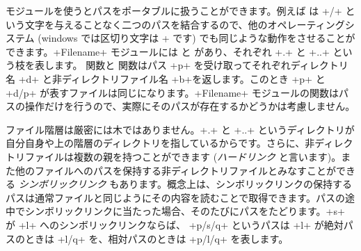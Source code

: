  モジュールを使うとパスをポータブルに扱うことができます。例えば  は \ml+/+ という文字を与えることなく二つのパスを結合するので、他のオペレーティングシステム (windows では区切り文字は \ml+\+ です) でも同じような動作をさせることができます。\ml+Filename+ モジュールには  と があり、それぞれ \ml+.+ と \ml+..+ という枝を表します。 関数と  関数はパス \ml+p+ を受け取ってそれぞれディレクトリ名 \ml+d+ と非ディレクトリファイル名 \ml+b+を返します。このとき \ml+p+ と \ml+d/p+ が表すファイルは同じになります。\ml+Filename+ モジュールの関数はパスの操作だけを行うので、実際にそのパスが存在するかどうかは考慮しません。

ファイル階層は厳密には木ではありません。\ml+.+ と \ml+..+ というディレクトリが自分自身や上の階層のディレクトリを指しているからです。さらに、非ディレクトリファイルは複数の親を持つことができます (\emph{ハードリンク} と言います)。また他のファイルへのパスを保持する非ディレクトリファイルとみなすことができる \emph{シンボリックリンク} もあります。概念上は、シンボリックリンクの保持するパスは通常ファイルと同じようにその内容を読むことで取得できます。パスの途中でシンボリックリンクに当たった場合、そのたびにパスをたどります。\ml+s+ が \ml+l+ へのシンボリックリンクならば、 \ml+p/s/q+ というパスは \ml+l+ が絶対パスのときは \ml+l/q+ を、相対パスのときは \ml+p/l/q+ を表します。

